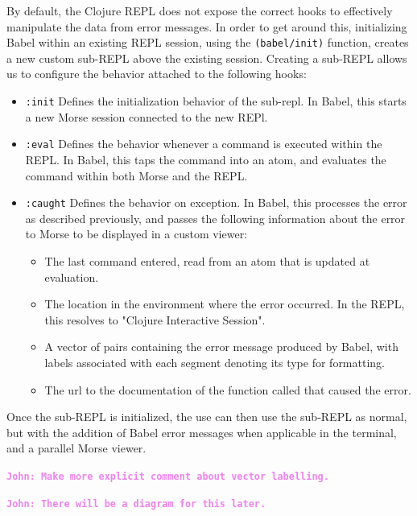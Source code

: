 \documentclass[12pt]{article}
\newcommand{\comment}[1]{{\bf \tt  {#1}}}
\newcommand{\jwcomment}[1]{\textcolor{violet}{\comment{John: {#1}}}}
\begin{document}
By default, the Clojure REPL does not expose the correct hooks to effectively manipulate the data from error messages.
In order to get around this, initializing Babel within an existing REPL session, using the \texttt{(babel/init)} function, creates a new custom sub-REPL above the existing session.
Creating a sub-REPL allows us to configure the behavior attached to the following hooks:
\begin{itemize}
	\item \texttt{:init} Defines the initialization behavior of the sub-repl. 
		In Babel, this starts a new Morse session connected to the new REPl.
	\item \texttt{:eval} Defines the behavior whenever a command is executed within the REPL. 
		In Babel, this taps the command into an atom, and evaluates the command within both Morse and the REPL.
	\item \texttt{:caught} Defines the behavior on exception.
		In Babel, this processes the error as described previously, 
			and passes the following information about the error to Morse to be displayed in a custom viewer:
			\begin{itemize}
				\item The last command entered, read from an atom that is updated at evaluation.
				\item The location in the environment where the error occurred. In the REPL, this resolves to "Clojure Interactive Session".
				\item A vector of pairs containing the error message produced by Babel, with labels associated with each segment denoting its type for formatting.
				\item The url to the documentation of the function called that caused the error. 
			\end{itemize}
\end{itemize}
Once the sub-REPL is initialized, the use can then use the sub-REPL as normal, but with the addition of Babel error messages when applicable in the terminal, and a parallel Morse viewer.

\jwcomment{Make more explicit comment about vector labelling.}

\jwcomment{There will be a diagram for this later.}
\end{document}

